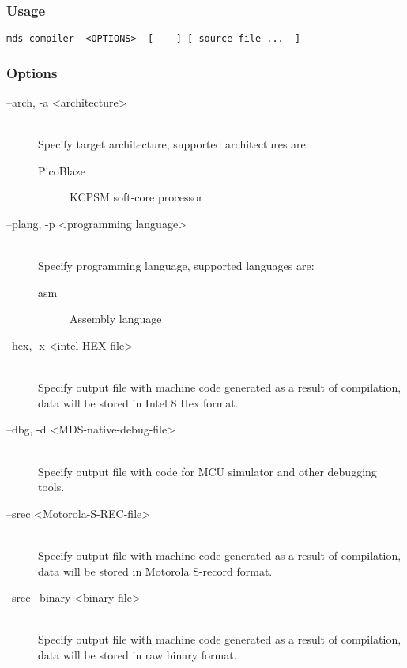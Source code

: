         \subsubsection{Usage}
            \verb'mds-compiler  <OPTIONS>  [ -- ] [ source-file ...  ]'

        \subsubsection{Options}
            \begin{description}
                \item[--arch, -a <architecture>]~\\
                    Specify target architecture, supported architectures are:
                    \begin{description}
                        \item[PicoBlaze] KCPSM soft-core processor
                    \end{description}

                \item[--plang, -p <programming language>]~\\
                    Specify programming language, supported languages are:
                    \begin{description}
                        \item[asm] Assembly language
                    \end{description}

                \item[--hex, -x <intel HEX-file>]~\\
                    Specify output file with machine code generated as a result of compilation, data will be stored in Intel 8 Hex format.

                \item[--dbg, -d <MDS-native-debug-file>]~\\
                    Specify output file with code for MCU simulator and other debugging tools.

                \item[--srec <Motorola-S-REC-file>]~\\
                    Specify output file with machine code generated as a result of compilation, data will be stored in Motorola S-record format.

                \item[--srec --binary <binary-file>]~\\
                    Specify output file with machine code generated as a result of compilation, data will be stored in raw binary format.


\end{description}

